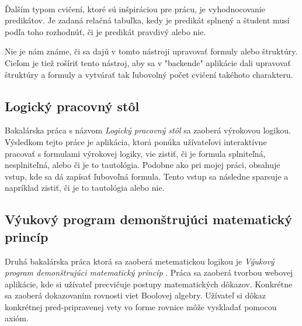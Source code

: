 \paragraph{}
Ďalším typom cvičení, ktoré sú inšpiráciou pre prácu, je vyhodnocovanie predikátov. Je zadaná relačná tabuľka, kedy je predikát splnený a študent musí podľa toho rozhodnúť, či je predikát pravdivý alebo nie.

Nie je nám známe, či sa dajú v tomto nástroji upravovať formuly alebo štruktúry. Cieľom je tiež rošíriť tento nástroj, aby sa v "backende" aplikácie dali upravovať štruktúry a formuly a vytvárať tak ľubovolný počet cvičení takéhoto charakteru.

\subsection{Logický pracovný stôl}
Bakalárska práca s názvom \emph{Logický pracovný stôl} \cite{lps} sa zaoberá výrokovou logikou. Výsledkom tejto práce je aplikácia, ktorá ponúka užívateľovi interaktívne pracovať s formulami výrokovej logiky, vie zistiť, či je formula splniteľná, nesplniteľná, alebo či je to tautológia. Podobne ako pri mojej práci, obsahuje vstup, kde sa dá zapísať ľubovoľná formula. Tento vstup sa následne sparsuje a napríklad zistiť, či je to tautológia alebo nie.

\subsection{Výukový program demonštrujúci matematický princíp}
Druhá bakalárska práca ktorá sa zaoberá metematickou logikou je \emph{Výukový program demonštrujúci matematický princíp} \cite{vpdmp}. Práca sa zaoberá tvorbou webovej aplikácie, kde si užívateľ precvičuje postupy matematických dôkazov. Konkrétne sa zaoberá dokazovaním rovnosti viet Boolovej algebry. Užívateľ si dôkaz konkrétnej pred-pripravenej vety vo forme rovnice môže vyskladať pomocou axióm. 
